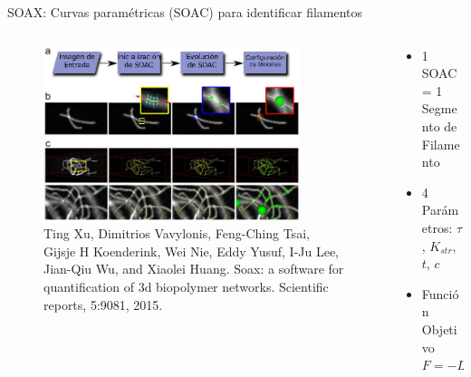 \documentclass[aspectratio=169]{beamer}
\begin{document}

\begin{frame}{SOAX: Curvas param\'etricas (SOAC) para identificar filamentos}
    \begin{columns}
        \begin{column}{0.65\textwidth}
             \begin{figure}
                \centering
                \includegraphics[height=2in]{Pictures/SOAX_translated.jpg}
                \caption{Ting Xu, Dimitrios Vavylonis, Feng-Ching Tsai, Gijsje H Koenderink, Wei Nie, Eddy Yusuf, I-Ju Lee, Jian-Qiu Wu, and Xiaolei Huang. Soax: a software for quantification of 3d biopolymer networks. Scientific reports, 5:9081, 2015.}
            \end{figure}       
        \end{column}
        \begin{column}{0.35\textwidth}
            \begin{itemize}\fontsize{9pt}{10.2}\selectfont
                \item 1 SOAC = 1 Segmento de Filamento
                \item 4 Par\'ametros: $\tau$, $K_{str}$, $t$, $c$
                \item Funci\'on Objetivo $F = -L_{total} + cL_{<t}$
            \end{itemize}
        \end{column}
    \end{columns}
\end{frame}
\end{document}
